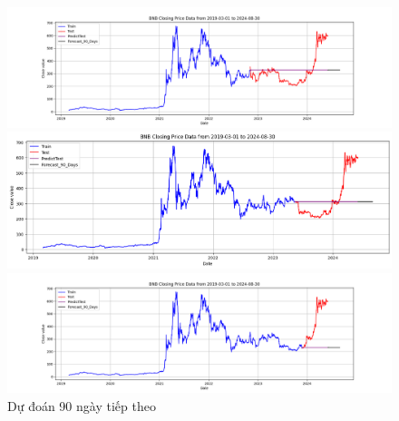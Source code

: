 \documentclass[conference]{IEEEtran}
\begin{document}
	\begin{figure}[H]
		\centering
		\begin{minipage}{0.15\textwidth}
			\centering
			\includegraphics[width=1\textwidth]{Figure/ARIMA_BNB_90days_73.png}
		\end{minipage}
		\hfill
		\begin{minipage}{0.15\textwidth}
			\centering
			\includegraphics[width=1\textwidth]{Figure/ARIMA_BNB_90days_82.png}
		\end{minipage}
		\hfill
		\begin{minipage}{0.15\textwidth}
			\centering
			\includegraphics[width=1\textwidth]{Figure/ARIMA_BNB_90days_91.png}
		\end{minipage}
		\caption{Dự đoán 90 ngày tiếp theo}
		\label{fig:1}
	\end{figure}
	
\end{document}
